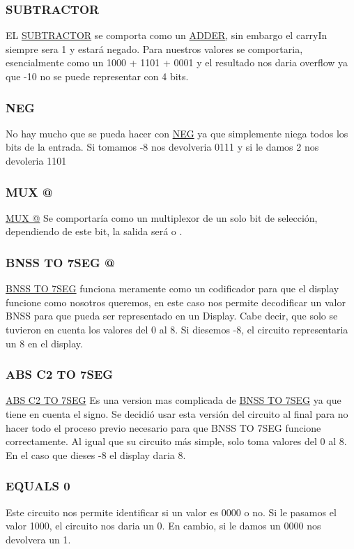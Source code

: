 \documentclass{article}
\begin{document}
\subsubsection{SUBTRACTOR}
EL \hyperref[sec:SUBTRACTOR]{SUBTRACTOR} se comporta como un \hyperref[sec:ADDER]{ADDER}, sin embargo el carryIn siempre sera 1 y  estará negado. Para nuestros valores se comportaria, esencialmente como un 1000 + 1101 + 0001 y el resultado nos daria overflow ya que -10 no se puede representar con 4 bits.

\subsubsection{NEG}
No hay mucho que se pueda hacer con \hyperref[sec:NEG]{NEG} ya que simplemente niega todos los bits de la entrada. Si tomamos -8 nos devolveria 0111 y si le damos 2 nos devoleria 1101
\subsubsection{MUX @}
\hyperref[sec:MUX@]{MUX @} Se comportaría como un multiplexor de un solo bit de selección, dependiendo de este bit, la salida será  o .  
\subsubsection{BNSS TO 7SEG @}
\hyperref[sec:BNSS7SEG]{BNSS TO 7SEG} funciona meramente como un codificador para que el display funcione como nosotros queremos, en este caso nos permite decodificar un valor BNSS para que pueda ser representado en un Display. Cabe decir, que solo se tuvieron en cuenta los valores del 0 al 8. Si diesemos -8, el circuito representaria un 8 en el display.
\subsubsection{ABS C2 TO 7SEG}
\hyperref[sec:ABSC27SEG]{ABS C2 TO 7SEG} Es una version mas complicada de \hyperref[sec:BNSS7SEG]{BNSS TO 7SEG} ya que tiene en cuenta el signo. Se decidió usar esta versión del circuito al final para no hacer todo el proceso previo necesario para que BNSS TO 7SEG funcione correctamente. Al igual que su circuito más simple, solo toma valores del 0 al 8. En el caso que dieses -8 el display daria 8.

\subsubsection{EQUALS 0}
Este circuito nos permite identificar si un valor es 0000 o no. Si le pasamos el valor 1000, el circuito nos daria un 0. En cambio, si le damos un 0000 nos devolvera un 1.
\end{document}
